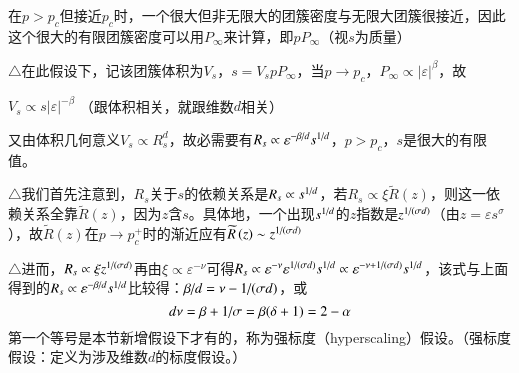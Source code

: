 \documentclass{article} %
\begin{document}
\noindent 在$p>p_{c} $但接近$p_{c} $时，一个很大但非无限大的团簇密度与无限大团簇很接近，因此这个很大的有限团簇密度可以用$P_{\infty } $来计算，即$pP_{\infty } $（视$s$为质量）

\noindent $\mathrm{\triangle}$在此假设下，记该团簇体积为$V_{s} $，$s=V_{s} pP_{\infty } $，当$p\to p_{c} $，$P_{\infty } \propto \left|\varepsilon \right|^{\beta } $，故

 $V_{s} \propto s\left|\varepsilon \right|^{-\beta } $ （跟体积相关，就跟维数$d$相关）

\noindent 又由体积几何意义$V_{s} \propto R_{s}^{d} $，故必需要有$R_{s} \propto \varepsilon ^{-{\beta \mathord{\left/ {\vphantom {\beta  d}} \right. \kern-\nulldelimiterspace} d} } s^{{1\mathord{\left/ {\vphantom {1 d}} \right. \kern-\nulldelimiterspace} d} } $，$p>p_{c} $，$s$是很大的有限值。

\noindent $\mathrm{\triangle}$我们首先注意到，$R_{s} $关于$s$的依赖关系是$R_{s} \propto s^{{1\mathord{\left/ {\vphantom {1 d}} \right. \kern-\nulldelimiterspace} d} } $，若$R_{s} \propto \xi \widetilde{R}\left(z\right)$，则这一依赖关系全靠$\widetilde{R}\left(z\right)$，因为$z$含$s$。具体地，一个出现$s^{{1\mathord{\left/ {\vphantom {1 d}} \right. \kern-\nulldelimiterspace} d} } $的$z$指数是$z^{{1\mathord{\left/ {\vphantom {1 (\sigma d)}} \right. \kern-\nulldelimiterspace} (\sigma d)} } $（由$z=\varepsilon s^{\sigma } $），故$\widetilde{R}\left(z\right)$在$p\to p_{c}^{+} $时的渐近应有$\widetilde{R}\left(z\right)\sim z^{{1\mathord{\left/ {\vphantom {1 (\sigma d)}} \right. \kern-\nulldelimiterspace} (\sigma d)} } $

\noindent $\mathrm{\triangle}$进而，$R_{s} \propto \xi z^{{1\mathord{\left/ {\vphantom {1 (\sigma d)}} \right. \kern-\nulldelimiterspace} (\sigma d)} } $再由$\xi \propto \varepsilon ^{-\nu } $可得$R_{s} \propto \varepsilon ^{-\nu } \varepsilon ^{{1\mathord{\left/ {\vphantom {1 (\sigma d)}} \right. \kern-\nulldelimiterspace} (\sigma d)} } s^{{1\mathord{\left/ {\vphantom {1 d}} \right. \kern-\nulldelimiterspace} d} } \propto \varepsilon ^{-\nu +{1\mathord{\left/ {\vphantom {1 (\sigma d)}} \right. \kern-\nulldelimiterspace} (\sigma d)} } s^{{1\mathord{\left/ {\vphantom {1 d}} \right. \kern-\nulldelimiterspace} d} } $，该式与上面得到的$R_{s} \propto \varepsilon ^{-{\beta \mathord{\left/ {\vphantom {\beta  d}} \right. \kern-\nulldelimiterspace} d} } s^{{1\mathord{\left/ {\vphantom {1 d}} \right. \kern-\nulldelimiterspace} d} } $比较得：${\beta \mathord{\left/ {\vphantom {\beta  d}} \right. \kern-\nulldelimiterspace} d} =\nu -{1\mathord{\left/ {\vphantom {1 (\sigma d)}} \right. \kern-\nulldelimiterspace} (\sigma d)} $，或
\[d\nu =\beta +{1\mathord{\left/ {\vphantom {1 \sigma }} \right. \kern-\nulldelimiterspace} \sigma } =\beta (\delta +1)=2-\alpha \] 
第一个等号是本节新增假设下才有的，称为强标度（hyperscaling）假设。（强标度假设：定义为涉及维数$d$的标度假设。）
\end{document}
